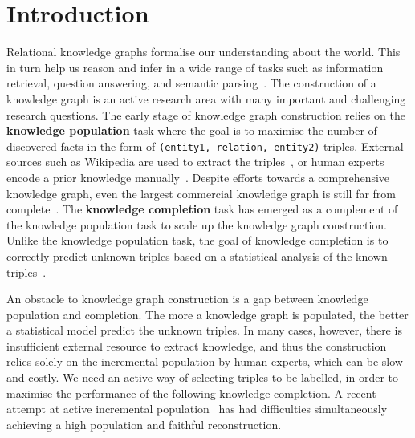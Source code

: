 
\section{Introduction}
\label{sec:intro}

Relational knowledge graphs formalise our understanding about the world. 
This in turn help us reason and infer in a wide range of tasks such as information retrieval, question answering, and semantic parsing~\cite{Dong2015,jiang2015improving}.
The construction of a knowledge graph is an active research area with many important and challenging research questions.
The early stage of knowledge graph construction relies on the {\bf knowledge population} task
where the goal is to maximise the number of discovered facts in the form of \texttt{(entity1, relation, entity2)} triples.
External sources such as Wikipedia are used to extract the triples~\cite{hoffart2013yago2},
or human experts encode a prior knowledge manually~\cite{bollacker2008freebase}.
Despite efforts towards a comprehensive knowledge graph,
even the largest commercial knowledge graph is still far from complete~\cite{dong2014knowledge}.
The {\bf knowledge completion} task has emerged as a complement of the knowledge population task
to scale up the knowledge graph construction.
Unlike the knowledge population task, the goal of knowledge completion is to correctly predict unknown triples based on a statistical analysis of the known triples~\cite{Lao2010,nickel2011three}.

An obstacle to knowledge graph construction is a gap between knowledge
population and completion. The more a knowledge graph is populated, the better a statistical model predict the unknown triples. In many cases, however, there is insufficient external resource to extract knowledge, and thus the construction relies solely on the incremental population by human experts, which can be slow and costly.
We need an active way of selecting triples to be labelled, in order to maximise the performance of the following knowledge completion.
A recent attempt at active incremental population~\cite{kajino2015active}
has had difficulties simultaneously achieving a high population and faithful reconstruction.

